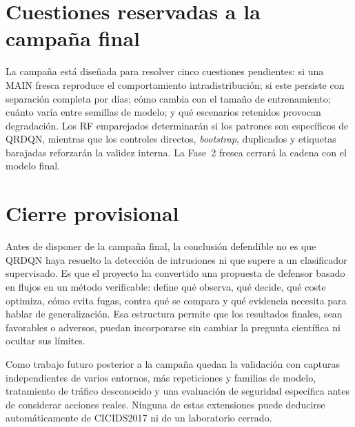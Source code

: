 \section{Cuestiones reservadas a la campaña final}

La campaña está diseñada para resolver cinco cuestiones pendientes: si una MAIN fresca reproduce el comportamiento intradistribución; si este persiste con separación completa por días; cómo cambia con el tamaño de entrenamiento; cuánto varía entre semillas de modelo; y qué escenarios retenidos provocan degradación. Los RF emparejados determinarán si los patrones son específicos de QRDQN, mientras que los controles directos, \emph{bootstrap}, duplicados y etiquetas barajadas reforzarán la validez interna. La Fase~2 fresca cerrará la cadena con el modelo final.


\section{Cierre provisional}

Antes de disponer de la campaña final, la conclusión defendible no es que QRDQN haya resuelto la detección de intrusiones ni que supere a un clasificador supervisado. Es que el proyecto ha convertido una propuesta de defensor basado en flujos en un método verificable: define qué observa, qué decide, qué coste optimiza, cómo evita fugas, contra qué se compara y qué evidencia necesita para hablar de generalización. Esa estructura permite que los resultados finales, sean favorables o adversos, puedan incorporarse sin cambiar la pregunta científica ni ocultar sus límites.

Como trabajo futuro posterior a la campaña quedan la validación con capturas independientes de varios entornos, más repeticiones y familias de modelo, tratamiento de tráfico desconocido y una evaluación de seguridad específica antes de considerar acciones reales. Ninguna de estas extensiones puede deducirse automáticamente de CICIDS2017 ni de un laboratorio cerrado.
